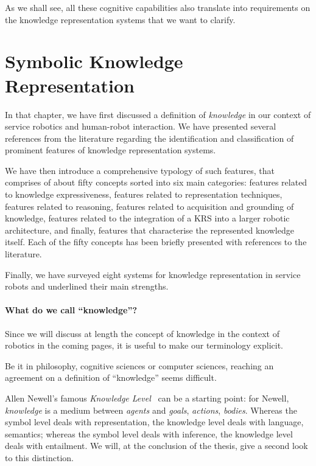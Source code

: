 As we shall see, all these cognitive capabilities also translate into
requirements on the knowledge representation systems that we want to clarify.



\section{Symbolic Knowledge Representation}


In that chapter, we have first discussed a definition of \emph{knowledge} in
our context of service robotics and human-robot interaction. We have presented
several references from the literature regarding the identification and
classification of prominent features of knowledge representation systems. 

We have then introduce a comprehensive typology of such features, that
comprises of about fifty concepts sorted into six main categories: features
related to knowledge expressiveness, features related to representation
techniques, features related to reasoning, features related to acquisition and
grounding of knowledge, features related to the integration of a KRS into a
larger robotic architecture, and finally, features that characterise the
represented knowledge itself. Each of the fifty concepts has been briefly
presented with references to the literature.

Finally, we have surveyed eight systems for knowledge representation in service
robots and underlined their main strengths.


\paragraph{What do we call ``knowledge''?}
\label{sect|on-knowledge}

Since we will discuss at length the concept of knowledge in the context of
robotics in the coming pages, it is useful to make our terminology explicit.

Be it in philosophy, cognitive sciences or computer sciences, reaching an
agreement on a definition of ``knowledge'' seems difficult.

Allen Newell's famous \emph{Knowledge Level}~\cite{Newell1981} can be a
starting point: for Newell, \emph{knowledge} is a medium between \emph{agents}
and \emph{goals}, \emph{actions}, \emph{bodies}. Whereas the symbol level deals
with representation, the knowledge level deals with language, semantics;
whereas the symbol level deals with inference, the knowledge level deals with
entailment. We will, at the conclusion of the thesis, give a second look to
this distinction.

